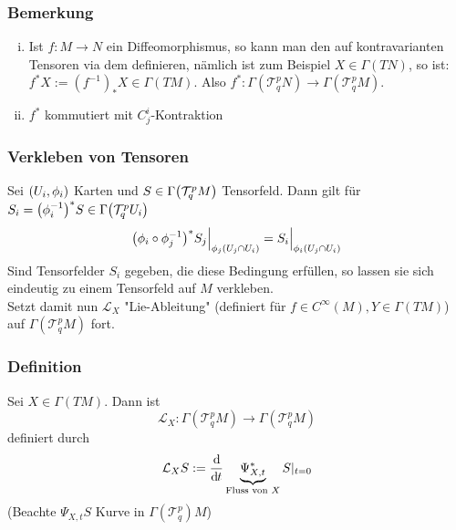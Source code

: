 \subsubsection{Bemerkung}
\label{ssub:183}
\begin{enumerate}[(i)]
\item Ist $f:M\to N$ ein Diffeomorphismus, so kann man den  auf kontravarianten Tensoren via dem  definieren, nämlich ist zum Beispiel $X\in \Gamma(TN)$, so ist: $f^*X:= (f^{-1})_* X \in \Gamma(TM)$. Also $f^*:\Gamma(\mathcal{T}_q^p N)\to \Gamma(\mathcal{T}_q^p M)$.
\item $f^*$ kommutiert mit $C_j^i$-Kontraktion
\end{enumerate}

\subsubsection{Verkleben von Tensoren}
\label{ssub:184}
Sei $(U_i,\phi_i)$ Karten und $S\in \Gamma\enbrace*{\mathcal{T}_q^p M}$ Tensorfeld. Dann gilt für $S_i = \enbrace*{\phi_i^{-1}}^* S\in \Gamma\enbrace*{\mathcal{T}_q^p U_i}$
\[
\enbrace*{\phi_i \circ \phi_j^{-1}}^* S_j \Big\vert_{\phi_j(U_j\cap U_i)} = S_i \Big\vert_{\phi_i(U_j\cap U_i)}
\]
Sind Tensorfelder $S_i$ gegeben, die diese Bedingung erfüllen, so lassen sie sich eindeutig zu einem Tensorfeld auf $M$ verkleben.\\
Setzt damit nun $\mathcal{L}_X$ "Lie-Ableitung" (definiert für $f\in C^\infty(M), Y\in \Gamma(TM)$) auf $\Gamma(\mathcal{T}_q^p M)$ fort.

\subsubsection{Definition}
\label{ssub:185}
Sei $X\in \Gamma(TM)$. Dann ist
\[
\mathcal{L}_X:\Gamma(\mathcal{T}_q^p M) \to \Gamma(\mathcal{T}_q^p M)
\]
definiert durch
\[
\mathcal{L}_X S:= \frac{\mathrm{d}\mkern-1.0mu}{\mathrm{d}\mkern-1.0mu t} \underbrace{\Psi^*_{X,t}}_{\text{Fluss von } X} S\vert_{t=0}
\]
(Beachte $\Psi_{X,t} S$ Kurve in $\Gamma(\mathcal{T}_q^p) M$)

